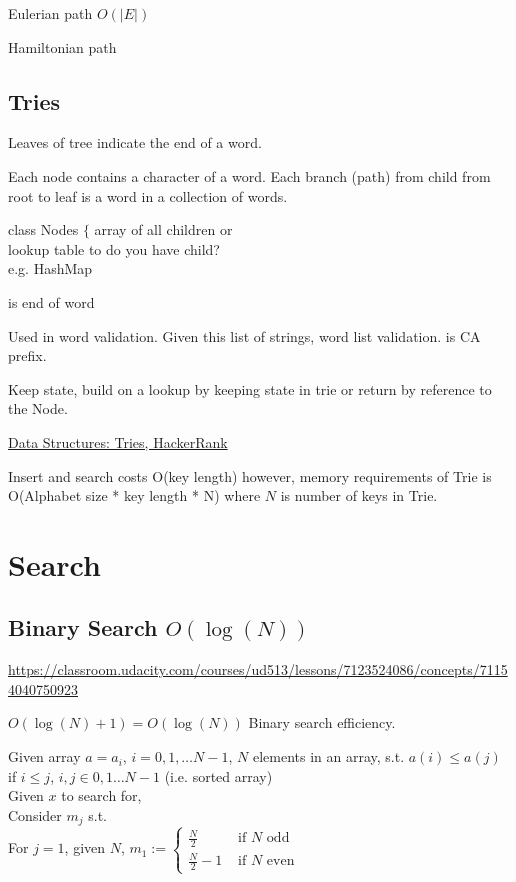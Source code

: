 \documentclass[10pt]{amsart}
\begin{document}
Eulerian path $O(|E|) $ 

Hamiltonian path

\subsection{Tries}

Leaves of tree indicate the end of a word.

Each node contains a character of a word. Each branch (path) from child from root to leaf is a word in a collection of words. 

class Nodes $\lbrace $ array of all children or \\
lookup table to do you have child? \\
e.g. HashMap

is end of word

Used in word validation. Given this list of strings, word list validation.
is CA prefix.

Keep state, build on a lookup by keeping state in trie or return by reference to the Node.

\href{https://youtu.be/zIjfhVPRZCg}{Data Structures: Tries, HackerRank}

Insert and search costs O(key length) however, memory requirements of Trie is O(Alphabet size * key length * N) where $N$ is number of keys in Trie.


\section{Search}

\subsection{Binary Search $O(\log{(N)})$}

\url{https://classroom.udacity.com/courses/ud513/lessons/7123524086/concepts/71154040750923}

$O(\log{(N)} + 1) = O(\log{(N)})$ Binary search efficiency.

Given array $a=a_i$, $i=0,1,\dots N-1$, $N$ elements in an array, s.t. $a(i) \leq a(j)$ if $i\leq j$, $i,j \in 0, 1\dots N-1$ (i.e. sorted array) \\
Given $x$ to search for, \\
Consider $m_j$ s.t. \\
For $j=1$, given $N$, $m_1 := \begin{cases} \frac{N}{2} & \text{ if $N$ odd } \\
\frac{N}{2} -1 & \text{ if $N$ even } \end{cases} $ \\
\end{document}

